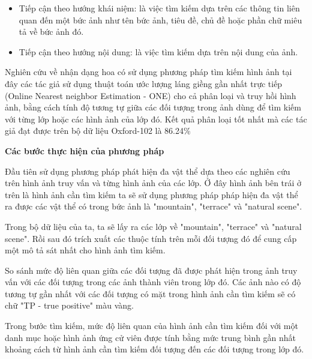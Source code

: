 \documentclass[12pt]{report}
\begin{document}
		\begin{itemize}
			\item Tiếp cận theo hướng khái niệm: là việc tìm kiếm dựa trên các thông tin liên quan đến một bức ảnh như tên bức ảnh, tiêu đề, chủ đề hoặc phần chữ miêu tả về bức ảnh đó.
			\item Tiếp cận theo hướng nội dung: là việc tìm kiếm dựa trên nội dung của ảnh.
		\end{itemize}
		Nghiên cứu về nhận dạng hoa có sử dụng phương pháp tìm kiếm hình ảnh \cite{cia-ONE} tại đây các tác giả sử dụng thuật toán ước lượng láng giềng gần nhất trực tiếp (Online Nearest neighbor Estimation - ONE) cho cả phân loại và truy hồi hình ảnh, bằng cách tính độ tương tự giữa các đối tượng trong ảnh dùng để tìm kiếm với từng lớp hoặc các hình ảnh của lớp đó. Kết quả phân loại tốt nhất mà các tác giả đạt được trên bộ dữ liệu Oxford-102 \cite{cia-Nilsback06} là 86.24\%
				
				
																						
		\textbf{Các bước thực hiện của phương pháp}
		
																						
		Đầu tiên sử dụng phương pháp phát hiện đa vật thể dựa theo các nghiên cứu \cite{cia_object_propo_1} \cite{cia_object_propo_2} \cite{cia_object_propo_3} trên hình ảnh truy vấn và từng hình ảnh của các lớp. Ở đây hình ảnh bên trái ở trên là hình ảnh cần tìm kiếm ta sẽ sử dụng phương pháp pháp hiện đa vật thể ra được các vật thể có trong bức ảnh là "mountain", "terrace" và "natural scene".
																						
		Trong bộ dữ liệu của ta, ta sẽ lấy ra các lớp về "mountain", "terrace" và "natural scene". Rồi sau đó trích xuất các thuộc tính trên mỗi đối tượng đó để cung cấp một mô tả sát nhất cho hình ảnh tìm kiếm. 
																						
		So sánh mức độ liên quan giữa các đối tượng đã được phát hiện trong ảnh truy vấn với các đối tượng trong các ảnh thành viên trong lớp đó. Các ảnh nào có độ tương tự gần nhất với các đối tượng có mặt trong hình ảnh cần tìm kiếm sẽ có chữ "TP - true positive" màu vàng.
																						
		Trong bước tìm kiếm, mức độ liên quan của hình ảnh cần tìm kiếm đối với một danh mục hoặc hình ảnh ứng cử viên được tính bằng mức trung bình gần nhất khoảng cách từ hình ảnh cần tìm kiếm đối tượng đến các đối tượng trong lớp đó.
		
\end{document}
